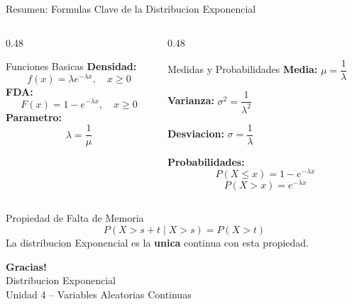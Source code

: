 \documentclass[10pt]{beamer}
\begin{document}
\begin{frame}{Resumen: Formulas Clave de la Distribucion Exponencial}
\begin{columns}[T]
\begin{column}{0.48\textwidth}
    \begin{block}{Funciones Basicas}
        \textbf{Densidad:}
        \[
        f(x) = \lambda e^{-\lambda x}, \quad x \geq 0
        \]
        \textbf{FDA:}
        \[
        F(x) = 1 - e^{-\lambda x}, \quad x \geq 0
        \]
        \textbf{Parametro:}
        \[
        \lambda = \frac{1}{\mu}
        \]
    \end{block}
\end{column}
\begin{column}{0.48\textwidth}
    \begin{exampleblock}{Medidas y Probabilidades}
        \textbf{Media:} $\mu = \dfrac{1}{\lambda}$

        \textbf{Varianza:} $\sigma^2 = \dfrac{1}{\lambda^2}$

        \textbf{Desviacion:} $\sigma = \dfrac{1}{\lambda}$

        \vspace{0.2cm}
        \textbf{Probabilidades:}
        \[
        P(X \leq x) = 1 - e^{-\lambda x}
        \]
        \[
        P(X > x) = e^{-\lambda x}
        \]
    \end{exampleblock}
\end{column}
\end{columns}

\vspace{0.2cm}
\begin{alertblock}{Propiedad de Falta de Memoria}
\[
P(X > s + t \mid X > s) = P(X > t)
\]
\centering
\small La distribucion Exponencial es la \textbf{unica} continua con esta propiedad.
\end{alertblock}
\end{frame}

\begin{frame}[plain]
    \centering
    \vspace{1cm}

    {\Huge \color{deepseekblue} \textbf{Gracias!}}\\[0.5cm]
    {\Large \color{darkblue} Distribucion Exponencial}\\[0.3cm]
    {\normalsize \color{black} Unidad 4 -- Variables Aleatorias Continuas}\\[1cm]

\end{frame}
\end{document}
